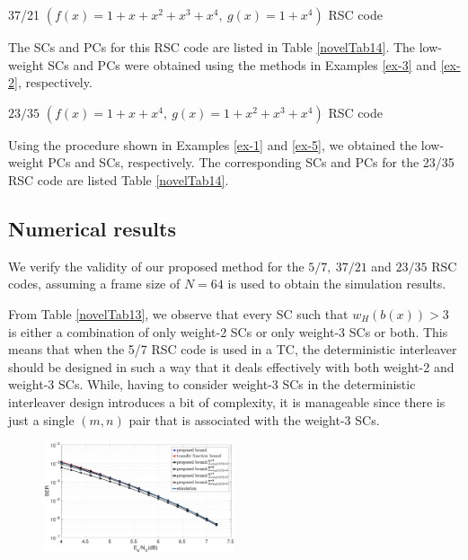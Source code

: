 \begin{example}{37/21 $\left( f(x)=1+x+x^2+x^3+x^4 , ~g(x)=1+x^4\right)$ RSC code}
	
	The  SCs and PCs for this RSC code are listed in Table \ref{novelTab14}.
	The low-weight SCs and PCs were obtained using the methods in Examples \ref{ex-3} and \ref{ex-2}, respectively. 
	
	\label{ex-7}
\end{example}

\begin{example}{$23/35$ $\left(f(x)=1+x+x^4,~g(x)=1+x^2+x^3+x^4 \right)$ RSC code }
	
	Using the procedure shown in Examples  \ref{ex-1} and  \ref{ex-5}, we obtained the  low-weight PCs and SCs, respectively.
	The corresponding SCs and PCs  for the 23/35 RSC code are listed Table \ref{novelTab14}.
	
\end{example}

\subsection{Numerical results}
We verify the validity of our proposed method for the $5/7,~37/21$ and $23/35$ RSC codes, assuming a frame size of $N=64$ is used to obtain the simulation results. 



From Table \ref{novelTab13}, we observe that every SC such that $w_H(b(x)) >3$ is either a combination of only weight-2 SCs or only weight-3 SCs or both. This means that when the 5/7 RSC code is used in a TC, the deterministic interleaver should be designed in such a way that it deals effectively with both weight-2 and weight-3 SCs. While, having to consider weight-3 SCs in the deterministic interleaver design introduces a bit of complexity, it is manageable since there is just a single $(m,n)$ pair that is associated with the weight-3 SCs.

\begin{figure}[htbp]
	\centering
	\includegraphics[width=0.5\textwidth]{./Images/RSC_5_7_lower_weights2.eps}
	\label{simFig1}
\end{figure}

